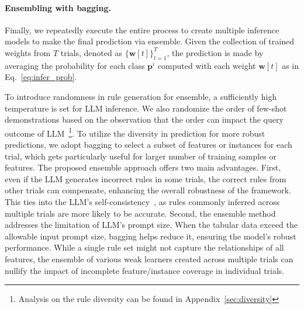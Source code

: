 \vspace*{-0.12in}
\paragraph{Ensembling with bagging.} Finally, we repeatedly execute the entire process to create multiple inference models to make the final prediction via ensemble. Given the collection of trained weights from $T$ trials, denoted as $\{\mathbf{w}[t]\}_{t=1}^T$, the prediction is made by averaging the probability for each class $\mathbf{p}^i$ computed with each weight $\mathbf{w}[t]$ as in Eq.~\ref{eq:infer_prob}.

To introduce randomness in rule generation for ensemble, a sufficiently high temperature is set for LLM inference. We also randomize the order of few-shot demonstrations based on the observation that the order can impact the query outcome of LLM~\cite{lu2022fantastically}\footnote{Analysis on the rule diversity can be found in Appendix~\ref{sec:diversity}}. To utilize the diversity in prediction for more robust predictions, we adopt bagging to select a subset of features or instances for each trial, which gets particularly useful for larger number of training samples or features. The proposed ensemble approach offers two main advantages. First, even if the LLM generates incorrect rules in some trials, the correct rules from other trials can compensate, enhancing the overall robustness of the framework. This ties into the LLM's self-consistency~\cite{wang2022self}, as rules commonly inferred across multiple trials are more likely to be accurate. Second, the ensemble method addresses the limitation of LLM's prompt size. When the tabular data exceed the allowable input prompt size, bagging helps reduce it, ensuring the model's robust performance. While a single rule set might not capture the relationships of all features, the ensemble of various weak learners created across multiple trials can nullify the impact of incomplete feature/instance coverage in individual trials.

